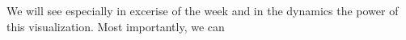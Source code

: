 We will see especially in excerise of the week and in the dynamics the power of this visualization. Most importantly, we can 